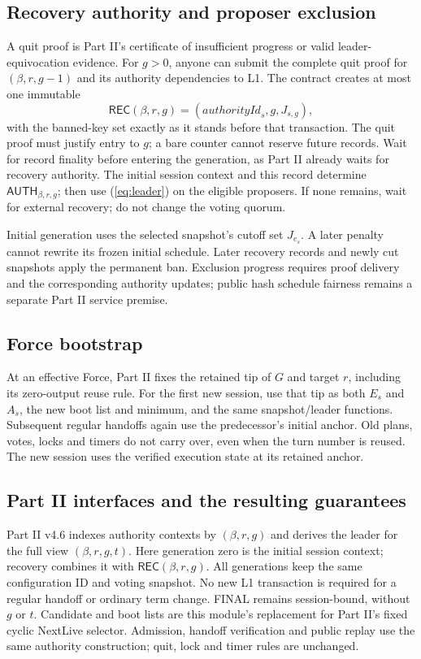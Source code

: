 \documentclass[11pt,a4paper]{article}
\newcommand{\tagg}[1]{\mathsf{#1}}
\begin{document}
\subsection{Recovery authority and proposer exclusion}
A quit proof is Part II's certificate of insufficient progress or valid
leader-equivocation evidence. For $g>0$, anyone can submit the complete
quit proof for $(\beta,r,g-1)$ and its authority dependencies to L1.
The contract creates at most one immutable
\[
 \tagg{REC}(\beta,r,g)=(\mathit{authorityId}_s,g,J_{s,g}),
\]
with the banned-key set exactly as it stands before that transaction.
The quit proof must justify entry to $g$; a bare counter cannot reserve
future records. Wait for record finality before entering the generation,
as Part II already waits for recovery authority. The initial session
context and this record determine $\tagg{AUTH}_{\beta,r,g}$; then use
(\ref{eq:leader}) on the eligible proposers. If none remains, wait for
external recovery; do not change the voting quorum.

Initial generation uses the selected snapshot's cutoff set $J_{e_s}$.
A later penalty cannot rewrite its frozen initial schedule. Later recovery
records and newly cut snapshots apply the permanent ban. Exclusion progress
requires proof delivery and the corresponding authority updates; public
hash schedule fairness remains a separate Part II service premise.

\subsection{Force bootstrap}
At an effective Force, Part II fixes the retained tip of $G$ and target
$r$, including its zero-output reuse rule. For the first new session, use
that tip as both $E_s$ and $A_s$, the new boot list and minimum, and the
same snapshot/leader functions. Subsequent regular handoffs again use the
predecessor's initial anchor. Old plans, votes, locks and timers do not
carry over, even when the turn number is reused. The new session uses the
verified execution state at its retained anchor.

\newpage
\subsection{Part II interfaces and the resulting guarantees}
Part II v4.6 indexes authority contexts by $(\beta,r,g)$ and derives the
leader for the full view $(\beta,r,g,t)$. Here generation zero is the
initial session context; recovery combines it with $\tagg{REC}(\beta,r,g)$.
All generations keep the same configuration ID and voting snapshot.
No new L1 transaction is required for a regular handoff or ordinary term
change. FINAL remains session-bound, without $g$ or $t$.
Candidate and boot lists are this module's replacement for Part II's
fixed cyclic NextLive selector. Admission, handoff verification and
public replay use the same authority construction; quit, lock and timer
rules are unchanged.
\end{document}
